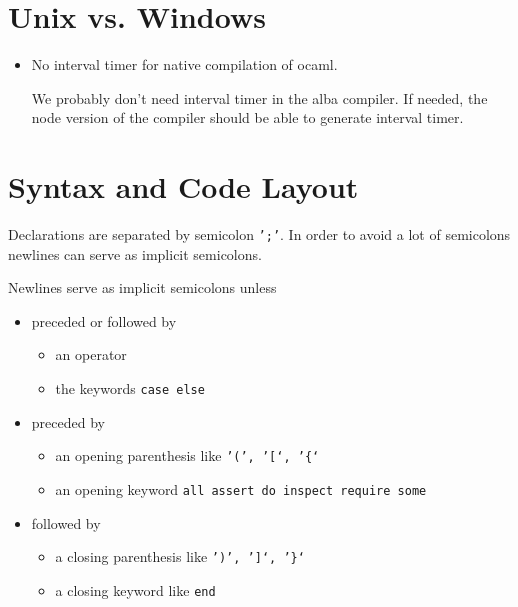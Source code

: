 \newpage
\section{Unix vs. Windows}

\begin{itemize}
\item No interval timer for native compilation of ocaml.

  We probably don't need interval timer in the alba compiler. If needed, the
  node version of the compiler should be able to generate interval timer.

\end{itemize}







\section{Syntax and Code Layout}

\lstset{language=alba}
Declarations are separated by semicolon {\tt ';'}. In order to avoid a lot of
semicolons newlines can serve as implicit semicolons.

Newlines serve as implicit semicolons unless
\begin{itemize}
\item preceded or followed by
  \begin{itemize}
    \item an operator
    \item the keywords \lstinline!case else!
  \end{itemize}
\item preceded by
  \begin{itemize}
  \item an opening parenthesis like {\tt '(', '[‘, '\{‘ }
  \item an opening keyword \lstinline!all assert do inspect require some!
  \end{itemize}
\item followed  by
  \begin{itemize}
    \item a closing parenthesis like {\tt ')', ']‘, '\}‘}
    \item a closing keyword like \lstinline!end!
  \end{itemize}
\end{itemize}


